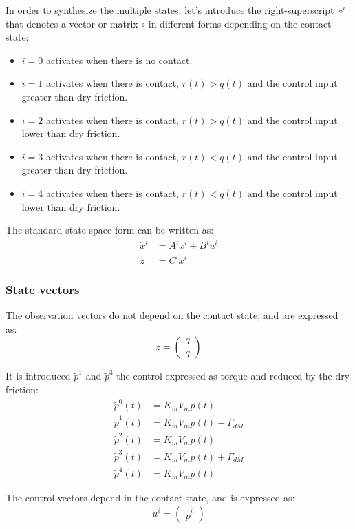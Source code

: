 \documentclass[english,12pt,a4paper]{article}
\begin{document}
		In order to synthesize the multiple states, let's introduce the right-superscript $\circ^i$ that denotes a vector or matrix $\circ$ in different forms depending on the contact state:
		\begin{itemize}
			\item $i = 0$ activates when there is no contact.
			\item $i = 1$ activates when there is contact, $r(t)>q(t)$ and the control input greater than dry friction.
			\item $i = 2$ activates when there is contact, $r(t)>q(t)$ and the control input lower than dry friction.
			\item $i = 3$ activates when there is contact, $r(t)<q(t)$ and the control input greater than dry friction.
			\item $i = 4$ activates when there is contact, $r(t)<q(t)$ and the control input lower than dry friction.
		\end{itemize}
		
		The standard state-space form can be written as:
		\begin{align}
			\dot{x}^i &= A^i x^i + B^i u^i \\
			z &= C^i x^i
		\end{align}
		
		\subsubsection{State vectors}
			The observation vectors do not depend on the contact state, and are expressed as:
			\begin{equation}
				z = \begin{pmatrix}
					q \\
					\dot{q}
				\end{pmatrix}
			\end{equation}
			
			It is introduced $\tilde{p}^1$ and $\tilde{p}^3$ the control expressed as torque and reduced by the dry friction:
			\begin{align}
				\tilde{p}^0(t) &= K_mV_mp(t) \\
				\tilde{p}^1(t) &= K_mV_mp(t) - \Gamma_{dM} \\
				\tilde{p}^2(t) &= K_mV_mp(t) \\
				\tilde{p}^3(t) &= K_mV_mp(t) + \Gamma_{dM} \\
				\tilde{p}^4(t) &= K_mV_mp(t)
			\end{align}
			
			The control vectors depend in the contact state, and is expressed as:
			\begin{equation}
				u^i = \begin{pmatrix}
					\tilde{p}^i
				\end{pmatrix}
			\end{equation}
			
\end{document}
